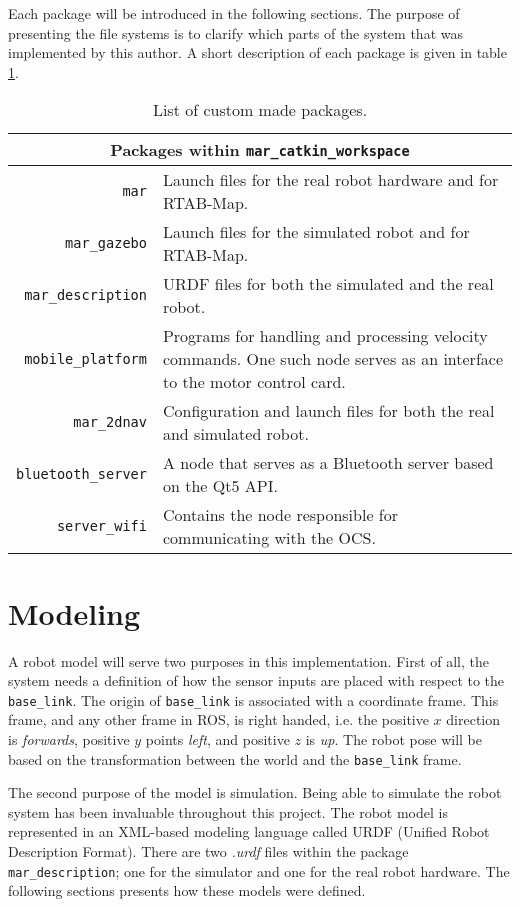 Each package will be introduced in the following sections. The purpose of presenting the file systems is to clarify which parts of the system that was implemented by this author. A short description of each package is given in table \ref{tab:list_packages}.

\begin{table}
	\centering
	\begin{tabular}{ r p{8.5cm} }
		\hline
		\multicolumn{2}{c}{Packages within \texttt{mar\_catkin\_workspace}}\\
		\hline
		\texttt{mar} & Launch files for the real robot hardware and for \ac{RTAB-Map}.\\
		\texttt{mar\_gazebo} & Launch files for the simulated robot and for \ac{RTAB-Map}.\\
		\texttt{mar\_description} & \ac{URDF} files for both the simulated and the real robot.\\
		\texttt{mobile\_platform} & Programs for handling and processing velocity commands. One such node serves as an interface to the motor control card.\\
		\texttt{mar\_2dnav} & Configuration and launch files for both the real and simulated robot.\\
		\texttt{bluetooth\_server} & A node that serves as a Bluetooth server based on the Qt5 API.\\
		\texttt{server\_wifi} & Contains the node responsible for communicating with the \ac{OCS}.\\
		\hline
	\end{tabular}
	\caption{List of custom made packages.}\label{tab:list_packages}
\end{table}


\section{Modeling}

A robot model will serve two purposes in this implementation. First of all, the system needs a definition of how the sensor inputs are placed with respect to the \texttt{base\_link}. The origin of \texttt{base\_link} is associated  with a coordinate frame. This frame, and any other frame in \ac{ROS}, is right handed, i.e. the positive $x$ direction is \textit{forwards}, positive $y$ points \textit{left}, and positive $z$ is \textit{up}. The robot pose will be based on the transformation between the world and the \texttt{base\_link} frame. 

The second purpose of the model is simulation. Being able to simulate the robot system has been invaluable throughout this project. The robot model is represented in an XML-based modeling language called \ac{URDF} (Unified Robot Description Format). There are two \textit{.urdf} files within the package \texttt{mar\_description}; one for the simulator and one for the real robot hardware. The following sections presents how these models were defined.



